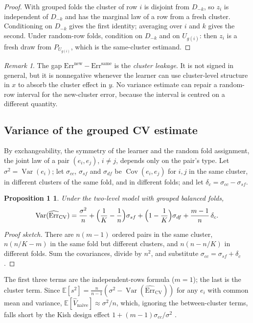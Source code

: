 \documentclass[11pt]{amsart}
\theoremstyle{plain}
\newtheorem*{prop1}{Proposition 1}
\theoremstyle{definition}
\theoremstyle{remark}
\newtheorem*{rem}{Remark}
\newcommand{\Var}{\operatorname{Var}}
\newcommand{\Cov}{\operatorname{Cov}}
\newcommand{\E}{\mathbb{E}}
\newcommand{\CV}{\widehat{\mathrm{Err}}_{\mathrm{CV}}}
\begin{document}
\begin{proof}
With grouped folds the cluster of row $i$ is disjoint from $D_{-k}$, so $z_i$ is independent of $D_{-k}$ and has the marginal law of a row from a fresh cluster. Conditioning on $D_{-k}$ gives the first identity; averaging over $i$ and $k$ gives the second. Under random-row folds, condition on $D_{-k}$ and on $U_{g(i)}$: then $z_i$ is a fresh draw from $P_{U_{g(i)}}$, which is the same-cluster estimand.
\end{proof}

\begin{rem}
The gap $\mathrm{Err}^{\mathrm{new}}-\mathrm{Err}^{\mathrm{same}}$ is the \emph{cluster leakage}. It is not signed in general, but it is nonnegative whenever the learner can use cluster-level structure in $x$ to absorb the cluster effect in $y$. No variance estimate can repair a random-row interval for the new-cluster error, because the interval is centred on a different quantity.
\end{rem}

\subsection{Variance of the grouped CV estimate}

By exchangeability, the symmetry of the learner and the random fold assignment, the joint law of a pair $(e_i,e_j)$, $i\neq j$, depends only on the pair's type. Let $\sigma^2=\Var(e_i)$; let $\sigma_{cc}$, $\sigma_{sf}$ and $\sigma_{df}$ be $\Cov(e_i,e_j)$ for $i,j$ in the same cluster, in different clusters of the same fold, and in different folds; and let $\delta_c=\sigma_{cc}-\sigma_{sf}$.

\begin{prop1}
Under the two-level model with grouped balanced folds,
\[
\Var(\CV)=\frac{\sigma^2}{n}+\Bigl(\frac1K-\frac1n\Bigr)\sigma_{sf}+\Bigl(1-\frac1K\Bigr)\sigma_{df}+\frac{m-1}{n}\,\delta_c .
\]
\end{prop1}

\begin{proof}[Proof sketch]
There are $n(m-1)$ ordered pairs in the same cluster, $n(n/K-m)$ in the same fold but different clusters, and $n(n-n/K)$ in different folds. Sum the covariances, divide by $n^2$, and substitute $\sigma_{cc}=\sigma_{sf}+\delta_c$.
\end{proof}

The first three terms are the independent-rows formula ($m=1$); the last is the cluster term. Since $\E[s^2]=\frac{n}{n-1}(\sigma^2-\Var(\CV))$ for any $e_i$ with common mean and variance, $\E[\hat V_{\mathrm{naive}}]\approx\sigma^2/n$, which, ignoring the between-cluster terms, falls short by the Kish design effect $1+(m-1)\sigma_{cc}/\sigma^2$ \cite{Kish}.
\end{document}
